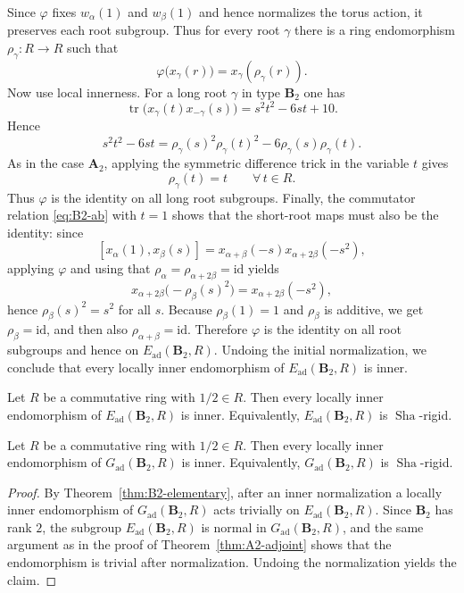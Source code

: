 \documentclass[]{jgcc}
\DeclareMathOperator{\tr}{tr}
\numberwithin{equation}{section}
\newcommand{\Sha}{\operatorname{Sha}}
\begin{document}
Since $\varphi$ fixes $w_\alpha(1)$ and $w_\beta(1)$ and hence normalizes the torus action,
it preserves each root subgroup.
Thus for every root $\gamma$ there is a ring endomorphism $\rho_\gamma\colon R\to R$ such that
\[
\varphi\bigl(x_\gamma(r)\bigr)=x_\gamma(\rho_\gamma(r)).
\]
Now use local innerness.
For a long root $\gamma$ in type $\mathbf B_2$ one has
\[
\tr\bigl(x_\gamma(t)x_{-\gamma}(s)\bigr)=s^2t^2-6st+10.
\]
Hence
\[
s^2t^2-6st=\rho_\gamma(s)^2\rho_\gamma(t)^2-6\rho_\gamma(s)\rho_\gamma(t).
\]
As in the case $\mathbf A_2$, applying the symmetric difference trick in the variable $t$ gives
\[
\rho_\gamma(t)=t\qquad\forall\,t\in R.
\]
Thus $\varphi$ is the identity on all long root subgroups.
Finally, the commutator relation \eqref{eq:B2-ab} with $t=1$ shows that the short-root maps must also be the identity:
since
\[
[x_\alpha(1),x_\beta(s)]=x_{\alpha+\beta}(-s)x_{\alpha+2\beta}(-s^2),
\]
applying $\varphi$ and using that $\rho_\alpha=\rho_{\alpha+2\beta}=\mathrm{id}$ yields
\[
x_{\alpha+2\beta}\bigl(-\rho_\beta(s)^2\bigr)=x_{\alpha+2\beta}(-s^2),
\]
hence $\rho_\beta(s)^2=s^2$ for all $s$.
Because $\rho_\beta(1)=1$ and $\rho_\beta$ is additive, we get $\rho_\beta=\mathrm{id}$,
and then also $\rho_{\alpha+\beta}=\mathrm{id}$.
Therefore $\varphi$ is the identity on all root subgroups and hence on $E_{\mathrm{ad}}(\mathbf B_2,R)$.
Undoing the initial normalization, we conclude that every locally inner endomorphism of
$E_{\mathrm{ad}}(\mathbf B_2,R)$ is inner.

\begin{thm}\label{thm:B2-elementary}
Let $R$ be a commutative ring with $1/2\in R$.
Then every locally inner endomorphism of $E_{\mathrm{ad}}(\mathbf B_2,R)$ is inner.
Equivalently, $E_{\mathrm{ad}}(\mathbf B_2,R)$ is $\Sha$-rigid.
\end{thm}

\begin{thm}\label{thm:B2-adjoint}
Let $R$ be a commutative ring with $1/2\in R$.
Then every locally inner endomorphism of $G_{\mathrm{ad}}(\mathbf B_2,R)$ is inner.
Equivalently, $G_{\mathrm{ad}}(\mathbf B_2,R)$ is $\Sha$-rigid.
\end{thm}

\begin{proof}
By Theorem~\ref{thm:B2-elementary}, after an inner normalization a locally inner endomorphism of $G_{\mathrm{ad}}(\mathbf B_2,R)$
acts trivially on $E_{\mathrm{ad}}(\mathbf B_2,R)$.
Since $\mathbf B_2$ has rank $2$, the subgroup $E_{\mathrm{ad}}(\mathbf B_2,R)$ is normal in $G_{\mathrm{ad}}(\mathbf B_2,R)$,
and the same argument as in the proof of Theorem~\ref{thm:A2-adjoint} shows that the endomorphism is trivial after normalization.
Undoing the normalization yields the claim.
\end{proof}
\end{document}

